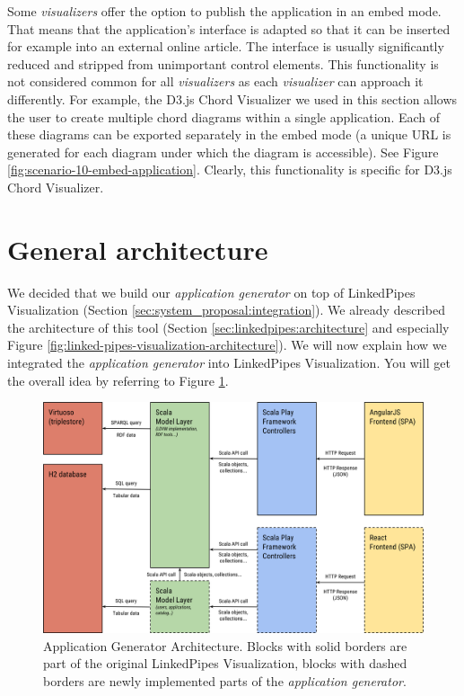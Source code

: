 Some \emph{visualizers} offer the option to publish the application in an embed mode. That means that the application's interface is adapted so that it can be inserted for example into an external online article. The interface is usually significantly reduced and stripped from unimportant  control elements. This functionality is not considered common for all \emph{visualizers}  as each \emph{visualizer} can approach it differently. For example, the D3.js Chord Visualizer we used in this section allows the user to create multiple chord diagrams within a single application. Each of these diagrams can be exported separately in the embed mode (a unique URL is generated for each diagram under which the diagram is accessible). See Figure \ref{fig:scenario-10-embed-application}. Clearly, this functionality is specific for D3.js Chord Visualizer.

\section{General architecture}
\label{sec:implementation:general-architecture}

We decided that we build our \emph{application generator} on top of LinkedPipes Visualization (Section \ref{sec:system_proposal:integration}). We already described the architecture of this tool (Section \ref{sec:linkedpipes:architecture} and especially Figure \ref{fig:linked-pipes-visualization-architecture}). We will now explain how we integrated the \emph{application generator} into LinkedPipes Visualization. You will get the overall idea by referring to Figure \ref{fig:application-generator-architecture}.

\begin{figure}
	\centering
	\includegraphics[width=140mm]{img/05_application_generator_architecture.png}
	\caption{Application Generator Architecture. Blocks with solid borders are part of the original LinkedPipes Visualization, blocks with dashed borders are newly implemented parts of the \emph{application generator}.} 
	\label{fig:application-generator-architecture}
\end{figure}

